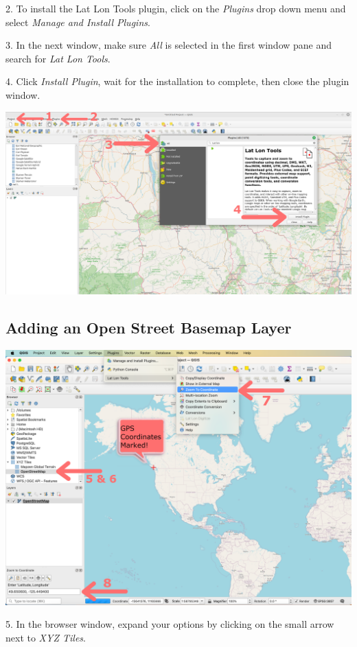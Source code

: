 \documentclass[oneside,a4paper,11pt,explicit]{book}
\begin{document}
	2. To install the Lat Lon Tools plugin, click on the \textit{Plugins} drop down menu and select \textit{Manage and Install Plugins}.
	
	3. In the next window, make sure \textit{All} is selected in the first window pane and search for \textit{Lat Lon Tools}.
	
	4. Click \textit{Install Plugin}, wait for the installation to complete, then close the plugin window.
	
	\centerline{\includegraphics[width=\textwidth]{LatLonTools.png}}
	
	\subsection{Adding an Open Street Basemap Layer}
	
	\centerline{\includegraphics[width=.9\textwidth]{QGISbasemap.png}}
	
	5. In the browser window, expand your options by clicking on the small arrow next to \textit{XYZ Tiles}.
	
\end{document}
